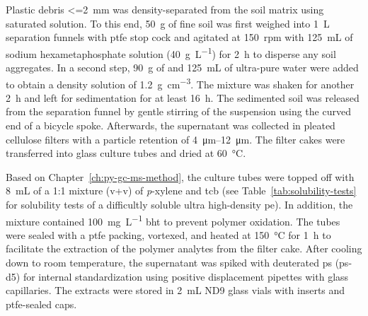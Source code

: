 Plastic debris \SI{<=2}{\milli\meter} was density-separated from the soil matrix using saturated  solution. To this end, \SI{50}{\gram} of fine soil was first weighed into \SI{1}{\liter} separation funnels with \ac{ptfe} stop cock and agitated at \SI{150}{rpm} with \SI{125}{\milli\liter} of sodium hexametaphosphate solution (\SI{40}{\gram\per\liter}) for \SI{2}{\hour} to disperse any soil aggregates. In a second step, \SI{90}{\gram} of  and \SI{125}{\milli\liter} of ultra-pure water were added to obtain a density solution of \SI{1.2}{\gram\per\cubic\centi\meter}. The mixture was shaken for another \SI{2}{\hour} and left for sedimentation for at least \SI{16}{\hour}. The sedimented soil was released from the separation funnel by gentle stirring of the suspension using the curved end of a bicycle spoke. Afterwards, the supernatant was collected in pleated cellulose filters with a particle retention of \SIrange{4}{12}{\micro\meter}. The filter cakes were transferred into glass culture tubes and dried at \SI{60}{\degreeCelsius}.

Based on Chapter~\ref{ch:py-gc-ms-method}, the culture tubes were topped off with \SI{8}{\milli\liter} of a 1:1 mixture (v+v) of \textit{p}-xylene and \ac{tcb} (see Table~\ref{tab:solubility-tests} for solubility tests of a difficultly soluble ultra high-density \ac{pe}). In addition, the mixture contained \SI{100}{\milli\gram\per\liter} \ac{bht} to prevent polymer oxidation.
The tubes were sealed with a \ac{ptfe} packing, vortexed, and heated at \SI{150}{\degreeCelsius} for \SI{1}{\hour} to facilitate the extraction of the polymer analytes from the filter cake.
After cooling down to room temperature, the supernatant was spiked with deuterated \ac{ps} (\ac{ps}-d5) for internal standardization using positive displacement pipettes with glass capillaries. The extracts were stored in \SI{2}{\milli\liter} ND9 glass vials with inserts and \ac{ptfe}-sealed caps.

